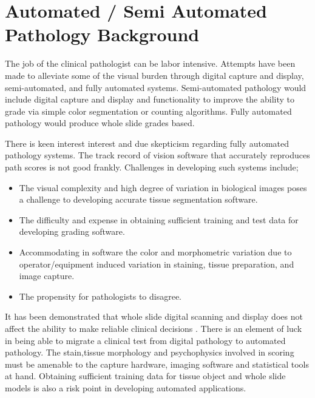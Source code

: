 \documentclass[10pt]{amsart}
\theoremstyle{definition}
\theoremstyle{remark}
\numberwithin{equation}{section}
\begin{document}
\section{Automated / Semi Automated Pathology Background}
The job of the clinical pathologist can be labor intensive.
Attempts have been made to alleviate some of the visual burden
through digital capture and display, semi-automated, and fully
automated systems. Semi-automated pathology would include digital
capture and display and functionality to improve the ability to
grade via simple color segmentation or counting algorithms.  Fully
automated pathology would produce whole slide grades based.

There is keen interest interest and due skepticism regarding fully
automated pathology systems. The track record of vision software
that accurately reproduces path scores is not good frankly.
Challenges in developing such systems include;
\begin{itemize}
    \item The visual complexity and high degree of variation in biological images
    poses a challenge to developing accurate tissue segmentation
    software.
    \item The difficulty and expense in obtaining sufficient
    training and test data for developing grading software.
    \item Accommodating in software the color and morphometric variation due to
    operator/equipment induced variation in staining, tissue preparation, and image capture.
    \item The propensity for pathologists to disagree.
\end{itemize}

It has been demonstrated that whole slide digital scanning and
display does not affect the ability to make reliable clinical
decisions \cite{1}.  There is an element of luck in being able to
migrate a clinical test from digital pathology to automated
pathology. The stain,tissue morphology and psychophysics involved
in scoring must be amenable to the capture hardware, imaging
software and statistical tools at hand.  Obtaining sufficient
training data for tissue object and whole slide models is also a
risk point in developing automated applications.
\end{document}
